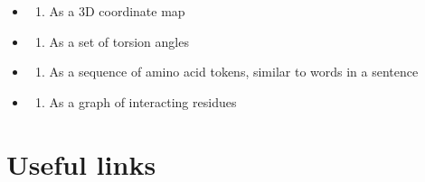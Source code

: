 \documentclass[
]{scrbook}
\providecommand{\tightlist}{%
  \setlength{\itemsep}{0pt}\setlength{\parskip}{0pt}}\usepackage{longtable,booktabs,array}
\begin{document}
\begin{itemize}
\tightlist
\item
  \begin{enumerate}
  \def\labelenumi{(\Alph{enumi})}
  \tightlist
  \item
    As a 3D coordinate map\\
  \end{enumerate}
\item
  \begin{enumerate}
  \def\labelenumi{(\Alph{enumi})}
  \setcounter{enumi}{1}
  \tightlist
  \item
    As a set of torsion angles\\
  \end{enumerate}
\item
  \begin{enumerate}
  \def\labelenumi{(\Alph{enumi})}
  \setcounter{enumi}{2}
  \tightlist
  \item
    As a sequence of amino acid tokens, similar to words in a sentence\\
  \end{enumerate}
\item
  \begin{enumerate}
  \def\labelenumi{(\Alph{enumi})}
  \setcounter{enumi}{3}
  \tightlist
  \item
    As a graph of interacting residues
  \end{enumerate}
\end{itemize}

\chapter{Useful links}\label{links}
\end{document}
